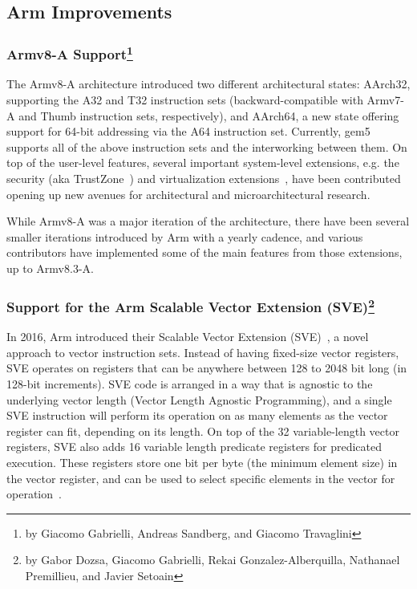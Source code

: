 \subsection[Arm Improvements]{Arm Improvements}
\label{sec:arm}

\subsubsection[Armv8-A Support]{Armv8-A Support\footnote{by Giacomo Gabrielli, Andreas Sandberg, and Giacomo Travaglini}}

The Armv8-A architecture introduced two different architectural states:
AArch32, supporting the A32 and T32 instruction sets (backward-compatible with
Armv7-A and Thumb instruction sets, respectively), and AArch64, a new
state offering support for 64-bit addressing via the A64 instruction set. Currently, gem5
supports all of the above instruction sets and the interworking
between them.
On top of the user-level features, several important system-level extensions, e.g. the
security (aka TrustZone\textregistered~\cite{ArmTustZone}) and virtualization extensions~\cite{ArmARM}, have been contributed opening up new avenues for architectural and microarchitectural research.

While Armv8-A was a major iteration of the architecture, there have been
several smaller iterations introduced by Arm with a yearly cadence, and various
contributors have implemented some of the main features from those extensions,
up to Armv8.3-A.

\subsubsection[Support for the Arm Scalable Vector Extension (SVE)]{Support for the Arm Scalable Vector Extension (SVE)\footnote{by Gabor Dozsa, Giacomo Gabrielli, Rekai Gonzalez-Alberquilla, Nathanael Premillieu, and Javier Setoain}}

In 2016, Arm introduced their Scalable Vector Extension (SVE)~\cite{ArmARM}, a
novel approach to vector instruction sets. Instead of having fixed-size vector
registers, SVE operates on registers that can be anywhere between 128 to 2048
bit long (in 128-bit increments). SVE code is arranged in a way that is agnostic to the
underlying vector length (Vector Length Agnostic Programming), and a single SVE
instruction will perform its operation on as many elements as the vector
register can fit, depending on its length. On top of the 32 variable-length
vector registers, SVE also adds 16 variable length predicate registers for
predicated execution. These registers store one bit per byte (the minimum
element size) in the vector register, and can be used to select specific
elements in the vector for operation~\cite{white-paper-on-SVE-and-VLA-programming}.

